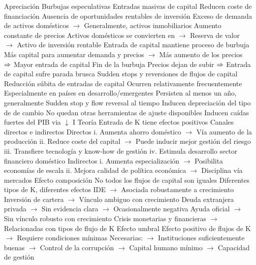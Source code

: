 \documentclass{nuevotema}
\begin{document}
\begin{esquemal}
				\4[$\then$] Apreciación
			\3 Burbujas especulativas
				\4 Entradas masivas de capital
				\4[] Reducen coste de financiación
				\4 Ausencia de oportunidades rentables de inversión
				\4[] Exceso de demanda de activos domésticos
				\4[] $\to$ Generalmente, activos inmobiliarios
				\4 Aumento constante de precios
				\4[] Activos domésticos se convierten en
				\4[] $\to$ Reserva de valor
				\4[] $\to$ Activo de inversión rentable
				\4 Entrada de capital mantiene proceso de burbuja
				\4[] Más capital para aumentar demanda y precios
				\4[] $\to$ Más aumento de los precios
				\4[] $\then$ Mayor entrada de capital
				\4 Fin de la burbuja
				\4[] Precios dejan de subir
				\4[] $\then$ Entrada de capital sufre parada brusca
			\3 Sudden stops y reversiones de flujos de capital
				\4 Reducción súbita de entradas de capital
				\4 Ocurren relativamente frecuentemente
				\4 Especialmente en países en desarrollo/emergentes
				\4 Persisten al menos un año, generalmente
				\4 Sudden stop y flow reversal al tiempo
				\4 Inducen depreciación del tipo de de cambio
				\4[] No quedan otras herramientas de ajuste disponibles
				\4 Inducen caídas fuertes del PIB via $\downarrow$ I
			\3 Teoría
				\4 Entrada de K tiene efectos positivos
				\4[] Canales directos e indirectos
				\4 Directos
				\4[] i. Aumenta ahorro doméstico
				\4[] $\to$ Vía aumento de la producción
				\4[] ii. Reduce coste del capital
				\4[] $\to$ Puede inducir mejor gestión del riesgo
				\4[] iii. Transfiere tecnología y know-how de gestión
				\4[] iv. Estimula desarrollo sector financiero doméstico
				\4 Indirectos
				\4[] i. Aumenta especialización
				\4[] $\to$ Posibilita economías de escala
				\4[] ii. Mejora calidad de política económica
				\4[] $\to$ Disciplina vía mercados
			\3 Efecto composición
				\4 No todos los flujos de capital son iguales
				\4[] Diferentes tipos de K, diferentes efectos
				\4[] IDE
				\4[] $\to$ Asociada robustamente a crecimiento
				\4 Inversión de cartera
				\4[] $\to$ Vínculo ambiguo con crecimiento
				\4 Deuda extranjera privada
				\4[] $\to$ Sin evidencia clara
				\4[] $\to$ Ocasionalmente negativa
				\4 Ayuda oficial
				\4[] $\to$ Sin vínculo robusto con crecimiento
				\4[] Crisis monetarias y financieras
				\4[] $\to$ Relacionadas con tipos de flujo de K
			\3 Efecto umbral
				\4 Efecto positivo de flujos de K
				\4[] $\to$ Requiere condiciones mínimas
				\4 Necesarias:
				\4[] $\to$ Instituciones suficientemente buenas
				\4[] $\to$ Control de la corrupción
				\4[] $\to$ Capital humano mínimo
				\4[] $\to$ Capacidad de gestión

\end{esquemal}
\end{document}
